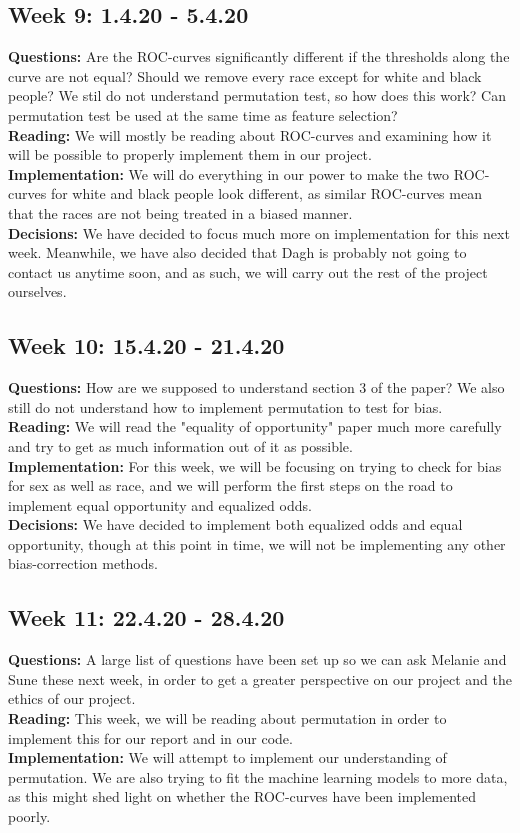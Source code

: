 \documentclass[11pt, fleqn]{article}
\begin{document}
\subsection*{Week 9: 1.4.20 - 5.4.20}
\textbf{Questions:} Are the ROC-curves significantly different if the thresholds along the curve are not equal? Should we remove every race except for white and black people? We stil do not understand permutation test, so how does this work? Can permutation test be used at the same time as feature selection? \\
\textbf{Reading:} We will mostly be reading about ROC-curves and examining how it will be possible to properly implement them in our project. \\
\textbf{Implementation:} We will do everything in our power to make the two ROC-curves for white and black people look different, as similar ROC-curves mean that the races are not being treated in a biased manner. \\
\textbf{Decisions:} We have decided to focus much more on implementation for this next week. Meanwhile, we have also decided that Dagh is probably not going to contact us anytime soon, and as such, we will carry out the rest of the project ourselves.

\subsection*{Week 10: 15.4.20 - 21.4.20}
\textbf{Questions:} How are we supposed to understand section 3 of the paper? We also still do not understand how to implement permutation to test for bias. \\
\textbf{Reading:} We will read the "equality of opportunity" paper much more carefully and try to get as much information out of it as possible. \\
\textbf{Implementation:} For this week, we will be focusing on trying to check for bias for sex as well as race, and we will perform the first steps on the road to implement equal opportunity and equalized odds. \\
\textbf{Decisions:} We have decided to implement both equalized odds and equal opportunity, though at this point in time, we will not be implementing any other bias-correction methods.

\subsection*{Week 11: 22.4.20 - 28.4.20}
\textbf{Questions:} A large list of questions have been set up so we can ask Melanie and Sune these next week, in order to get a greater perspective on our project and the ethics of our project. \\
\textbf{Reading:} This week, we will be reading about permutation in order to implement this for our report and in our code. \\
\textbf{Implementation:} We will attempt to implement our understanding of permutation. We are also trying to fit the machine learning models to more data, as this might shed light on whether the ROC-curves have been implemented poorly.
\end{document}
